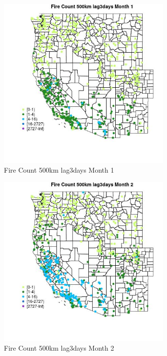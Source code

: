 \begin{figure} 
\centering  
\includegraphics[width=0.77\textwidth]{Code_Outputs/Report_ML_input_PM25_Step4_part_f_de_duplicated_aveswNAs_MapObsMo1Fire_Count_500km_lag3days.jpg} 
\caption{\label{fig:Report_ML_input_PM25_Step4_part_f_de_duplicated_aveswNAsMapObsMo1Fire_Count_500km_lag3days}Fire Count 500km lag3days Month 1} 
\end{figure} 
 

\begin{figure} 
\centering  
\includegraphics[width=0.77\textwidth]{Code_Outputs/Report_ML_input_PM25_Step4_part_f_de_duplicated_aveswNAs_MapObsMo2Fire_Count_500km_lag3days.jpg} 
\caption{\label{fig:Report_ML_input_PM25_Step4_part_f_de_duplicated_aveswNAsMapObsMo2Fire_Count_500km_lag3days}Fire Count 500km lag3days Month 2} 
\end{figure} 
 

